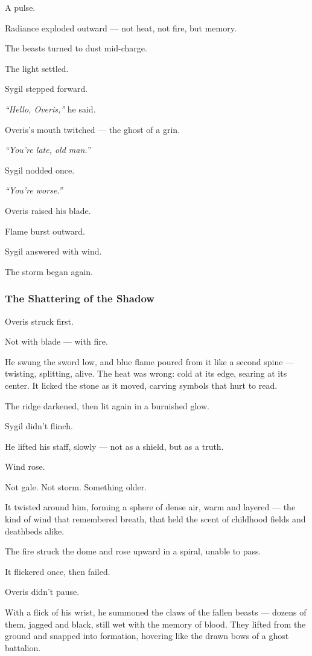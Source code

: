 \documentclass[12pt]{article}
\begin{document}
A pulse.

Radiance exploded outward — not heat, not fire, but memory.

The beasts turned to dust mid-charge.

The light settled.

Sygil stepped forward.

\textit{“Hello, Overis,”} he said.

Overis’s mouth twitched — the ghost of a grin.

\textit{“You’re late, old man.”}

Sygil nodded once.

\textit{“You’re worse.”}

Overis raised his blade.

Flame burst outward.

Sygil answered with wind.

The storm began again.

\dotfill

\subsubsection{The Shattering of the Shadow}

Overis struck first.

Not with blade — with fire.

He swung the sword low, and blue flame poured from it like a second spine — twisting, splitting, alive. The heat was wrong: cold at its edge, searing at its center. It licked the stone as it moved, carving symbols that hurt to read.

The ridge darkened, then lit again in a burnished glow.

Sygil didn’t flinch.

He lifted his staff, slowly — not as a shield, but as a truth.

Wind rose.

Not gale. Not storm. Something older.

It twisted around him, forming a sphere of dense air, warm and layered — the kind of wind that remembered breath, that held the scent of childhood fields and deathbeds alike.

The fire struck the dome and rose upward in a spiral, unable to pass.

It flickered once, then failed.

\bigskip

Overis didn’t pause.

With a flick of his wrist, he summoned the claws of the fallen beasts — dozens of them, jagged and black, still wet with the memory of blood. They lifted from the ground and snapped into formation, hovering like the drawn bows of a ghost battalion.
\end{document}

